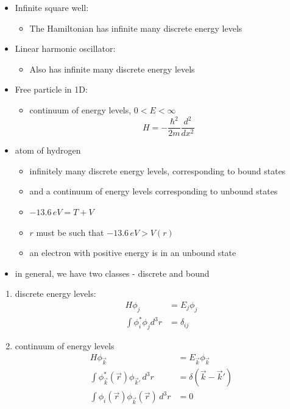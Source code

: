 \documentclass[a4paper,11pt,normalem]{article}
\begin{document}
\begin{itemize}
\item
  Infinite square well:
  \begin{itemize}
  \item
    The Hamiltonian has infinite many discrete energy levels
  \end{itemize}
\item
  Linear harmonic oscillator:
  \begin{itemize}
  \item
    Also has infinite many discrete energy levels
  \end{itemize}
\item
  Free particle in 1D:
  \begin{itemize}
  \item
    continuum of energy levels, \(0 < E < \infty\)
  \[
      H = -\frac{\hbar^2}{2m}\frac{d^2}{dx^2}
  \]
  \end{itemize}
\item
  atom of hydrogen
  \begin{itemize}
  \item
    infinitely many discrete energy levels, corresponding to bound
    states
  \item
    and a continuum of energy levels corresponding to unbound states
  \item
    \(-13.6\,eV = T + V\)
  \item
    \(r\) must be such that \(-13.6\,eV > V(r)\)
  \item
    an electron with positive energy is in an unbound state
  \end{itemize}
\item
  in general, we have two classes - discrete and bound
\end{itemize}

\begin{enumerate}
\item
  discrete energy levels:
\[
    \begin{aligned}
    H\phi_j &= E_j\phi_j \\
    \int \phi_i^* \phi_j d^3r &= \delta_{ij}
    \end{aligned}
\]
\item
  continuum of energy levels \[
  \begin{aligned}
  H\phi_{\vec{k}} &= E_{\vec{k}}\phi_{\vec{k}} \\
  \int \phi_{\vec{k}}^*(\vec{r})\phi_{\vec{k}'}\,d^3r &= \delta(\vec{k} - \vec{k}') \\
  \int \phi_i(\vec{r})\phi_{\vec{k}}(\vec{r})\,d^3r &= 0
  \end{aligned}
  \]
\end{enumerate}
\end{document}
